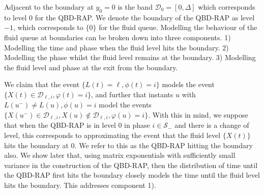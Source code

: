Adjacent to the boundary at \(y_0=0\) is the band \(\mathcal D_0=[0,\Delta]\) which corresponds to level \(0\) for the QBD-RAP. We denote the boundary of the QBD-RAP as level \(-1\), which corresponds to \(\{0\}\) for the fluid queue. Modelling the behaviour of the fluid queue at boundaries can be broken down into three components. 1) Modelling the time and phase when the fluid level hits the boundary. 2) Modelling the phase whilst the fluid level remains at the boundary. 3) Modelling the fluid level and phase at the exit from the boundary. 

We claim that the event \(\{L(t)=\ell,\phi(t)=i\}\) models the event \(\{X(t)\in\mathcal D_{\ell,i},\varphi(t)=i\}\), and further that instants \(u\) with \(L(u^-)\neq L(u), \phi(u)=i\) model the events \(\{X(u^-)\in \mathcal D_{\ell,i}, X(u)\notin\mathcal D_{\ell,i},\varphi(u)=i\}\). With this in mind, we suppose that when the QBD-RAP is in level \(0\) in phase \(i\in\mathcal S_-\) and there is a change of level, this corresponds to approximating the event that the fluid level \(\{X(t)\}\) hits the boundary at \(0\). We refer to this as the QBD-RAP hitting the boundary also. We show later that, using matrix exponentials with sufficiently small variance in the construction of the QBD-RAP, then the distribution of time until the QBD-RAP first hits the boundary closely models the time until the fluid level hits the boundary. This addresses component 1). 


